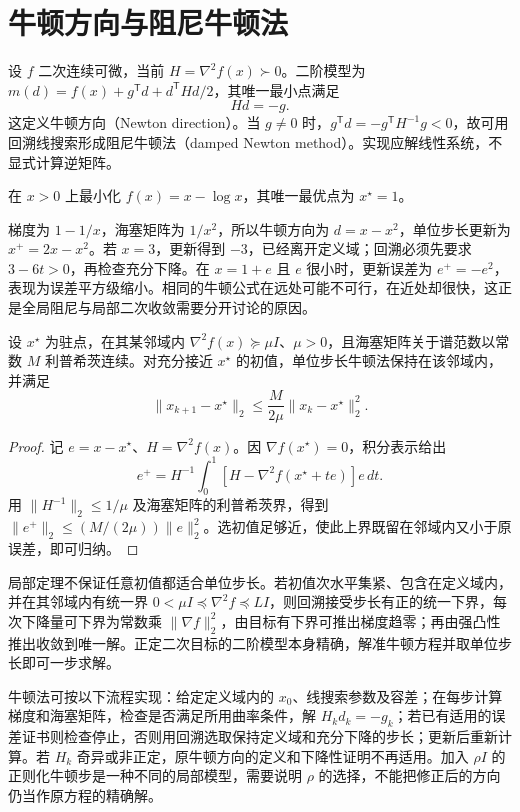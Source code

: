 \documentclass[UTF8,12pt,a4paper,fontset=fandol]{ctexbook}
\begin{document}
\section{牛顿方向与阻尼牛顿法}

设 $f$ 二次连续可微，当前 $H=\nabla^2f(x)\succ0$。二阶模型为 $m(d)=f(x)+g^{\mathsf T}d+d^{\mathsf T}Hd/2$，其唯一最小点满足
\begin{equation}
 Hd=-g.
 \label{eq:co-newton-direction}
\end{equation}
这定义牛顿方向（Newton direction）。当 $g\ne0$ 时，$g^{\mathsf T}d=-g^{\mathsf T}H^{-1}g<0$，故可用回溯线搜索形成阻尼牛顿法（damped Newton method）。实现应解线性系统，不显式计算逆矩阵。

\begin{example}[牛顿步为何需要阻尼]
在 $x>0$ 上最小化 $f(x)=x-\log x$，其唯一最优点为 $x^\star=1$。
\end{example}
\begin{solve}
梯度为 $1-1/x$，海塞矩阵为 $1/x^2$，所以牛顿方向为 $d=x-x^2$，单位步长更新为 $x^+=2x-x^2$。若 $x=3$，更新得到 $-3$，已经离开定义域；回溯必须先要求 $3-6t>0$，再检查充分下降。在 $x=1+e$ 且 $e$ 很小时，更新误差为 $e^+=-e^2$，表现为误差平方级缩小。相同的牛顿公式在远处可能不可行，在近处却很快，这正是全局阻尼与局部二次收敛需要分开讨论的原因。
\end{solve}

\begin{theorem}[局部二次收敛]
设 $x^\star$ 为驻点，在其某邻域内 $\nabla^2f(x)\succeq\mu I$、$\mu>0$，且海塞矩阵关于谱范数以常数 $M$ 利普希茨连续。对充分接近 $x^\star$ 的初值，单位步长牛顿法保持在该邻域内，并满足
\[
 \|x_{k+1}-x^\star\|_2\leq\frac{M}{2\mu}\|x_k-x^\star\|_2^2.
\]
\end{theorem}
\begin{proof}
记 $e=x-x^\star$、$H=\nabla^2f(x)$。因 $\nabla f(x^\star)=0$，积分表示给出
\[
 e^+=H^{-1}\int_0^1[H-\nabla^2f(x^\star+te)]e\,dt.
\]
用 $\|H^{-1}\|_2\leq1/\mu$ 及海塞矩阵的利普希茨界，得到 $\|e^+\|_2\leq(M/(2\mu))\|e\|_2^2$。选初值足够近，使此上界既留在邻域内又小于原误差，即可归纳。
\end{proof}

局部定理不保证任意初值都适合单位步长。若初值次水平集紧、包含在定义域内，并在其邻域内有统一界 $0<\mu I\preceq\nabla^2f\preceq LI$，则回溯接受步长有正的统一下界，每次下降量可下界为常数乘 $\|\nabla f\|_2^2$，由目标有下界可推出梯度趋零；再由强凸性推出收敛到唯一解。正定二次目标的二阶模型本身精确，解准牛顿方程并取单位步长即可一步求解。

牛顿法可按以下流程实现：给定定义域内的 $x_0$、线搜索参数及容差；在每步计算梯度和海塞矩阵，检查是否满足所用曲率条件，解 $H_kd_k=-g_k$；若已有适用的误差证书则检查停止，否则用回溯选取保持定义域和充分下降的步长；更新后重新计算。若 $H_k$ 奇异或非正定，原牛顿方向的定义和下降性证明不再适用。加入 $\rho I$ 的正则化牛顿步是一种不同的局部模型，需要说明 $\rho$ 的选择，不能把修正后的方向仍当作原方程的精确解。
\end{document}
